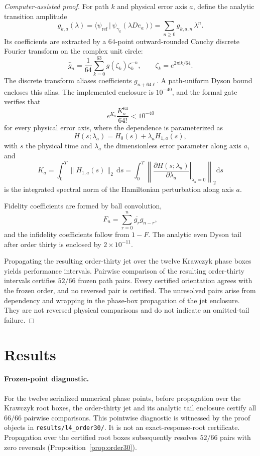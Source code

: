 \documentclass[11pt]{article}
\newcommand{\ii}{\mathrm{i}}
\newcommand{\dd}{\mathrm{d}}
\begin{document}
\begin{proof}[Computer-assisted proof]
For path $k$ and physical error axis $a$, define the analytic transition amplitude
\[
g_{k,a}(\lambda)
=
\langle\psi_{\mathrm{ref}}\,|\,
\psi_{\gamma_k}(\lambda D e_a)\rangle
=
\sum_{n\ge0} g_{k,a,n}\,\lambda^{n}.
\]
Its coefficients are extracted by a 64-point outward-rounded Cauchy discrete Fourier transform on the complex unit circle:
\begin{equation}
\widehat g_n
=\frac{1}{64}
\sum_{k=0}^{63}
g(\zeta_k)\zeta_k^{-n},
\qquad
\zeta_k=e^{2\pi\ii k/64}.
\label{eq:cauchy}
\end{equation}
The discrete transform aliases coefficients $g_{n+64\ell}$. A path-uniform Dyson bound encloses this alias. The implemented enclosure is $10^{-40}$, and the formal gate verifies that
\[
e^{K_a}\frac{K_a^{64}}{64!}<10^{-40}
\]
for every physical error axis, where the dependence is parameterized as
\[
H(s;\lambda_a)=H_0(s)+\lambda_a H_{1,a}(s),
\]
with $s$ the physical time and $\lambda_a$ the dimensionless error parameter along axis $a$, and
\[
K_a
=\int_0^T\|H_{1,a}(s)\|_2\,\dd s
=\int_0^T
\left\|
\left.
\frac{\partial H(s;\lambda_a)}{\partial\lambda_a}
\right|_{\lambda_a=0}
\right\|_2
\dd s
\]
is the integrated spectral norm of the Hamiltonian perturbation along axis $a$.

Fidelity coefficients are formed by ball convolution,
\[
F_n=\sum_{r=0}^n\overline{g_r}g_{n-r},
\]
and the infidelity coefficients follow from $1-F$. The analytic even Dyson tail after order thirty is enclosed by $2\times10^{-11}$.

Propagating the resulting order-thirty jet over the twelve Krawczyk phase boxes yields performance intervals. Pairwise comparison of the resulting order-thirty intervals certifies $52/66$ frozen path pairs. Every certified orientation agrees with the frozen order, and no reversed pair is certified. The unresolved pairs arise from dependency and wrapping in the phase-box propagation of the jet enclosure. They are not reversed physical comparisons and do not indicate an omitted-tail failure.
\end{proof}

\section{Results}

\paragraph{Frozen-point diagnostic.}
For the twelve serialized numerical phase points, before propagation
over the Krawczyk root boxes, the order-thirty jet and
its analytic tail enclosure certify all $66/66$ pairwise comparisons.
This pointwise diagnostic is witnessed by the proof objects in
\texttt{results/l4\_order30/}. It is not an exact-response-root
certificate. Propagation over the certified root boxes subsequently
resolves $52/66$ pairs with zero reversals
(Proposition~\ref{prop:order30}).
\end{document}

